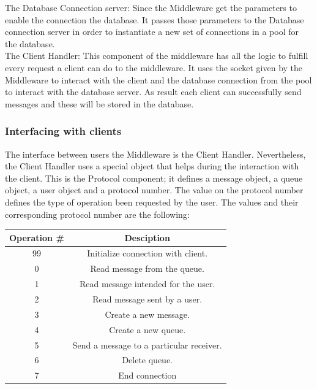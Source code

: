 The Database Connection server:
Since the Middleware get the parameters to enable the connection the database. It passes those parameters to the Database connection server in order to instantiate a new set of connections in a pool for the database.\\

The Client Handler:
This component of the middleware has all the logic to fulfill every request a client can do to the middleware. It uses the socket given by the Middleware to interact with the client and the database connection from the pool to interact with the database server. As result each client can successfully send messages and these will be stored in the database.


\subsubsection{Interfacing with clients}\label{sec:interfacing-with-clients}
The interface between users the Middleware is the Client Handler. Nevertheless, the Client Handler uses a special object that helps during the interaction with the client. This is the Protocol component; it defines a message object, a queue object, a user object and a protocol number. The value on the protocol number defines the type of operation been requested by the user. The values and their corresponding protocol number are the following:\\

\begin{table}\centering

\begin{tabular}
{|c|c|}
\hline  \textbf{Operation \#} & \textbf{Desciption} \\ 
\hline  99 & Initialize connection with client. \\ 
\hline  0 &  Read message from the queue.\\ 
\hline  1 &  Read message intended for the user.\\ 
\hline  2 &  Read message sent by a user.\\ 
\hline  3 &  Create a new message.\\ 
\hline  4 &  Create a new queue.\\ 
\hline  5 &  Send a message to a particular receiver.\\ 
\hline  6 &  Delete queue.\\ 
\hline  7 &  End connection \\ 
\hline 
\end{tabular} 
\end{table}


